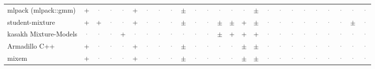 \documentclass[10pt,a4paper]{article}
\begin{document}
\begin{landscape}
{\begin{longtable}{@{}l *{24}{c}@{}}
mlpack (mlpack::gmm) & \cellcolor{yes!35}+ & \textcolor{gray}{·} & \textcolor{gray}{·} & \textcolor{gray}{·} & \cellcolor{yes!35}+ & \textcolor{gray}{·} & \textcolor{gray}{·} & \textcolor{gray}{·} & \cellcolor{part!45}$\pm$ & \textcolor{gray}{·} & \textcolor{gray}{·} & \textcolor{gray}{·} & \textcolor{gray}{·} & \textcolor{gray}{·} & \cellcolor{part!45}$\pm$ & \textcolor{gray}{·} & \textcolor{gray}{·} & \textcolor{gray}{·} & \textcolor{gray}{·} & \textcolor{gray}{·} & \textcolor{gray}{·} & \textcolor{gray}{·} & \textcolor{gray}{·} & \textcolor{gray}{·} \\
student-mixture & \cellcolor{yes!35}+ & \cellcolor{yes!35}+ & \textcolor{gray}{·} & \textcolor{gray}{·} & \cellcolor{yes!35}+ & \textcolor{gray}{·} & \textcolor{gray}{·} & \textcolor{gray}{·} & \cellcolor{part!45}$\pm$ & \textcolor{gray}{·} & \textcolor{gray}{·} & \cellcolor{part!45}$\pm$ & \cellcolor{part!45}$\pm$ & \cellcolor{yes!35}+ & \cellcolor{part!45}$\pm$ & \textcolor{gray}{·} & \textcolor{gray}{·} & \textcolor{gray}{·} & \textcolor{gray}{·} & \textcolor{gray}{·} & \textcolor{gray}{·} & \textcolor{gray}{·} & \cellcolor{part!45}$\pm$ & \textcolor{gray}{·} \\
kasakh Mixture-Models & \textcolor{gray}{·} & \textcolor{gray}{·} & \textcolor{gray}{·} & \cellcolor{yes!35}+ & \textcolor{gray}{·} & \textcolor{gray}{·} & \textcolor{gray}{·} & \textcolor{gray}{·} & \textcolor{gray}{·} & \textcolor{gray}{·} & \textcolor{gray}{·} & \cellcolor{part!45}$\pm$ & \cellcolor{yes!35}+ & \cellcolor{yes!35}+ & \cellcolor{yes!35}+ & \textcolor{gray}{·} & \textcolor{gray}{·} & \textcolor{gray}{·} & \textcolor{gray}{·} & \textcolor{gray}{·} & \textcolor{gray}{·} & \textcolor{gray}{·} & \textcolor{gray}{·} & \textcolor{gray}{·} \\
Armadillo C++ & \cellcolor{yes!35}+ & \textcolor{gray}{·} & \textcolor{gray}{·} & \textcolor{gray}{·} & \cellcolor{yes!35}+ & \textcolor{gray}{·} & \textcolor{gray}{·} & \textcolor{gray}{·} & \cellcolor{part!45}$\pm$ & \textcolor{gray}{·} & \textcolor{gray}{·} & \textcolor{gray}{·} & \textcolor{gray}{·} & \cellcolor{part!45}$\pm$ & \cellcolor{part!45}$\pm$ & \textcolor{gray}{·} & \textcolor{gray}{·} & \textcolor{gray}{·} & \textcolor{gray}{·} & \textcolor{gray}{·} & \textcolor{gray}{·} & \textcolor{gray}{·} & \textcolor{gray}{·} & \textcolor{gray}{·} \\
mixem & \cellcolor{yes!35}+ & \textcolor{gray}{·} & \textcolor{gray}{·} & \textcolor{gray}{·} & \cellcolor{yes!35}+ & \textcolor{gray}{·} & \textcolor{gray}{·} & \textcolor{gray}{·} & \cellcolor{part!45}$\pm$ & \textcolor{gray}{·} & \textcolor{gray}{·} & \textcolor{gray}{·} & \textcolor{gray}{·} & \cellcolor{part!45}$\pm$ & \cellcolor{part!45}$\pm$ & \textcolor{gray}{·} & \textcolor{gray}{·} & \textcolor{gray}{·} & \textcolor{gray}{·} & \textcolor{gray}{·} & \textcolor{gray}{·} & \textcolor{gray}{·} & \textcolor{gray}{·} & \textcolor{gray}{·} \\

\end{longtable}}
\end{landscape}
\end{document}
